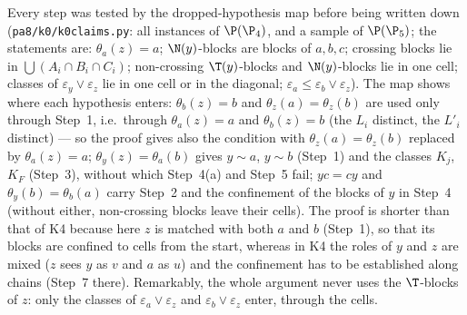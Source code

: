 Every step was tested by the dropped-hypothesis map before being written down (\texttt{pa8/k0/k0claims.py}: all instances of $\P(\P_4)$, and a sample of $\P(\P_5)$; the statements are: $\theta_a(z)=a$; $\N(y)$-blocks are blocks of $a,b,c$; crossing blocks lie in $\bigcup(A_i\cap B_i\cap C_i)$; non-crossing $\T(y)$-blocks and $\N(y)$-blocks lie in one cell; classes of $\varepsilon_y\vee\varepsilon_z$ lie in one cell or in the diagonal; $\varepsilon_a\le\varepsilon_b\vee\varepsilon_z$). The map shows where each hypothesis enters: $\theta_b(z)=b$ and $\theta_z(a)=\theta_z(b)$ are used only through Step~1, i.e.\ through $\theta_a(z)=a$ and $\theta_b(z)=b$ (the $L_i$ distinct, the $L'_i$ distinct) --- so the proof gives also the condition with $\theta_z(a)=\theta_z(b)$ replaced by $\theta_a(z)=a$; $\theta_y(z)=\theta_a(b)$ gives $y\sim a$, $y\sim b$ (Step~1) and the classes $K_j$, $K_F$ (Step~3), without which Step~4(a) and Step~5 fail; $yc=cy$ and $\theta_y(b)=\theta_b(a)$ carry Step~2 and the confinement of the blocks of $y$ in Step~4 (without either, non-crossing blocks leave their cells). The proof is shorter than that of K4 because here $z$ is matched with both $a$ and $b$ (Step~1), so that its blocks are confined to cells from the start, whereas in K4 the roles of $y$ and $z$ are mixed ($z$ sees $y$ as $v$ and $a$ as $u$) and the confinement has to be established along chains (Step~7 there). Remarkably, the whole argument never uses the $\T$-blocks of $z$: only the classes of $\varepsilon_a\vee\varepsilon_z$ and $\varepsilon_b\vee\varepsilon_z$ enter, through the cells.

